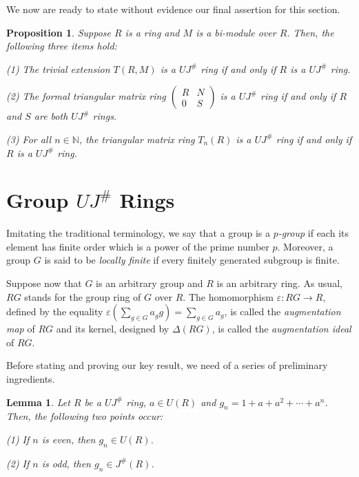 \documentclass[12pt]{amsart}
\newtheorem{proposition}[theorem]{Proposition}
\newtheorem{lemma}[theorem]{Lemma}
\theoremstyle{definition}
\begin{document}
\medskip

We now are ready to state without evidence our final assertion for this section.

\begin{proposition}\label{trivial}
Suppose $R$ is a ring and $M$ is a bi-module over $R$. Then, the following three items hold:

(1) The trivial extension $T(R, M)$ is a $UJ^{\#}$ ring if and only if $R$ is a $UJ^{\#}$ ring.

(2) The formal triangular matrix ring $\begin{pmatrix} R & N \\ 0 & S \end{pmatrix}$ is a $UJ^{\#}$ ring if and only if $R$ and $S$ are both $UJ^{\#}$ rings.

(3) For all $n \in \mathbb{N}$, the triangular matrix ring $T_{n}(R)$ is a $UJ^{\#}$ ring if and only if $R$ is a $UJ^{\#}$ ring.
\end{proposition}

\section{Group $UJ^{\#}$ Rings}

Imitating the traditional terminology, we say that a group is a {\it $p$-group} if each its element has finite order which is a power of the prime number $p$. Moreover, a group $G$ is said to be {\it locally finite} if every finitely generated subgroup is finite.

Suppose now that $G$ is an arbitrary group and $R$ is an arbitrary ring. As usual, $RG$ stands for the group ring of $G$ over $R$. The homomorphism $\varepsilon :RG\rightarrow R$, defined by the equality $\varepsilon (\displaystyle\sum_{g\in G}a_{g}g)=\displaystyle\sum_{g\in G}a_{g}$, is called the {\it augmentation map} of $RG$ and its kernel, designed by $\Delta (RG)$, is called the {\it augmentation ideal} of $RG$.

\medskip

Before stating and proving our key result, we need of a series of preliminary ingredients.

\begin{lemma}\label{sequ}
Let $R$ be a $UJ^{\#}$ ring, $a \in U(R)$ and $g_n = 1 + a + a^2 + \cdots + a^n$. Then, the following two points occur:
	
(1) If $n$ is even, then $g_n \in U(R)$.
	
(2) If $n$ is odd, then $g_n \in J^{\#}(R)$.
\end{lemma}
\end{document}
